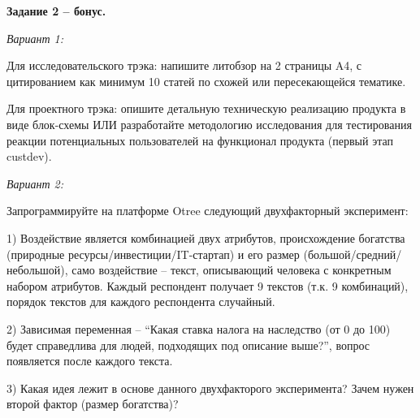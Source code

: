 \documentclass[12pt]{article}
\begin{document}
\textbf{Задание 2 -- бонус.}

\textit{Вариант 1:}

Для исследовательского трэка: напишите литобзор на 2 страницы A4,  с цитированием как минимум 10 статей по схожей или пересекающейся тематике.

Для проектного трэка: опишите детальную техническую реализацию продукта в виде блок-схемы ИЛИ разработайте методологию исследования для тестирования реакции потенциальных пользователей на функционал продукта (первый этап custdev).  

\textit{Вариант 2:}

Запрограммируйте на платформе Otree следующий двухфакторный эксперимент: 

1) Воздействие является комбинацией двух атрибутов,  происхождение богатства (природные ресурсы/инвестиции/IT-стартап) и его размер (большой/средний/небольшой),  само воздействие -- текст,  описывающий человека с конкретным набором атрибутов.  Каждый респондент получает 9 текстов (т.к.  9 комбинаций),  порядок текстов для каждого респондента случайный.  

2) Зависимая переменная -- ``Какая ставка налога на наследство (от 0 до 100) будет справедлива для людей, подходящих под описание выше?'',  вопрос появляется после каждого текста. 

3) Какая идея лежит в основе данного двухфакторого эксперимента? Зачем нужен второй фактор (размер богатства)? 
\end{document}
